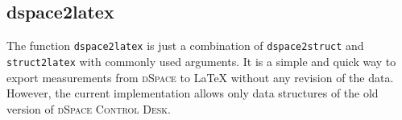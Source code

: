 \subsection{dspace2latex}
The function \texttt{dspace2latex} is just a combination of
\texttt{dspace2struct} and \texttt{struct2latex} with commonly used arguments.
It is a simple and quick way to export measurements from \textsc{dSpace} to
\LaTeX{} without any revision of the data. However, the current implementation
allows only data structures of the old version of \textsc{dSpace Control Desk}.
